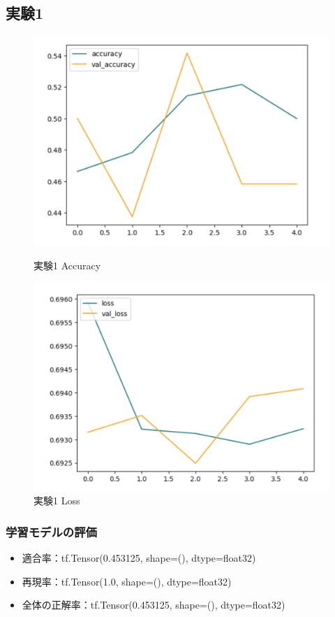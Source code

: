 \documentclass[a4paper, 11pt, titlepage]{jsarticle}
\begin{document}
\subsection{実験1}
\begin{figure}[htbp]
  \begin{minipage}[b]{0.45\linewidth}
    \centering
    \includegraphics[keepaspectratio, scale=0.32]{ex1_acc.png}
    \caption{実験1 Accuracy}
  \end{minipage}
  \begin{minipage}[b]{0.45\linewidth}
    \centering
    \includegraphics[keepaspectratio, scale=0.32]{ex1_loss.png}
    \caption{実験1 Loss}
  \end{minipage}
\end{figure}

\subsubsection{学習モデルの評価}
\begin{itemize}
\item 適合率：tf.Tensor(0.453125, shape=(), dtype=float32)
\item 再現率：tf.Tensor(1.0, shape=(), dtype=float32) 
\item 全体の正解率：tf.Tensor(0.453125, shape=(), dtype=float32)
\end{itemize}
\end{document}
